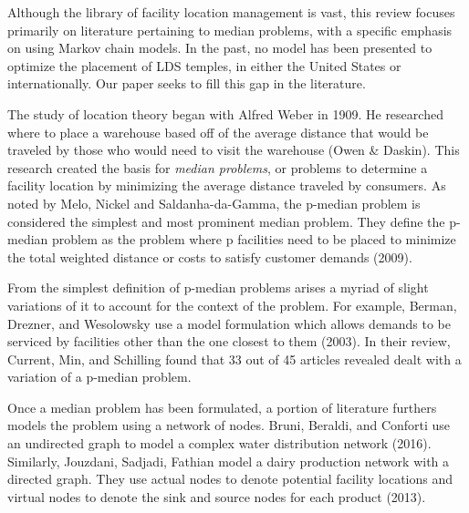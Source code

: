 \documentclass[twoside,twocolumn]{article}
\begin{document}
Although the library of facility location management is vast, this review focuses primarily on literature pertaining to median problems, with a specific emphasis on using Markov chain models.
In the past, no model has been presented to optimize the placement of LDS temples, in either the United States or internationally.
Our paper seeks to fill this gap in the literature. %

The study of location theory began with Alfred Weber in 1909. %
He researched where to place a warehouse based off of the average distance that would be traveled by those who would need to visit the warehouse (Owen \& Daskin).
This research created the basis for {\em median problems}, or problems to determine a facility location by minimizing the average distance traveled by consumers. %
As noted by Melo, Nickel and Saldanha-da-Gamma, the p-median problem is considered the simplest and most prominent median problem.  %
They define the p-median problem as the problem where p facilities need to be placed to minimize the total weighted distance or costs to satisfy customer demands (2009).

From the simplest definition of p-median problems arises a myriad of slight variations of it to account for the context of the problem. %
For example, Berman, Drezner, and Wesolowsky use a model formulation which allows demands to be serviced by facilities other than the one closest to them (2003). %
In their review, Current, Min, and Schilling found that 33 out of 45 articles revealed dealt with a variation of a p-median problem.

Once a median problem has been formulated, a portion of literature furthers models the problem using a network of nodes.
Bruni, Beraldi, and Conforti use an undirected graph to model a complex water distribution network (2016).
Similarly, Jouzdani, Sadjadi, Fathian model a dairy production network with a directed graph.
They use actual nodes to denote potential facility locations and virtual nodes to denote the sink and source nodes for each product (2013).
\end{document}
